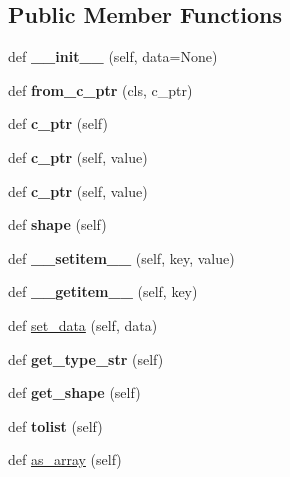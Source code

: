 \subsection*{Public Member Functions}
\begin{DoxyCompactItemize}
\item 
def {\bfseries \+\_\+\+\_\+init\+\_\+\+\_\+} (self, data=None)\hypertarget{a00002_a2cad05f1fdef0f40c5bafacfd8345404}{}\label{a00002_a2cad05f1fdef0f40c5bafacfd8345404}

\item 
def {\bfseries from\+\_\+c\+\_\+ptr} (cls, c\+\_\+ptr)\hypertarget{a00002_adac78b1be622ccda340ff3d2bada6c80}{}\label{a00002_adac78b1be622ccda340ff3d2bada6c80}

\item 
def {\bfseries c\+\_\+ptr} (self)\hypertarget{a00002_a850482baa4f0fbb70d64d00ddb106d0b}{}\label{a00002_a850482baa4f0fbb70d64d00ddb106d0b}

\item 
def {\bfseries c\+\_\+ptr} (self, value)\hypertarget{a00002_a12837a146c289d28a0e3afb831fe095a}{}\label{a00002_a12837a146c289d28a0e3afb831fe095a}

\item 
def {\bfseries c\+\_\+ptr} (self, value)\hypertarget{a00002_a12837a146c289d28a0e3afb831fe095a}{}\label{a00002_a12837a146c289d28a0e3afb831fe095a}

\item 
def {\bfseries shape} (self)\hypertarget{a00002_a57ffc01d476e783c0f3cdc6e34b2acf5}{}\label{a00002_a57ffc01d476e783c0f3cdc6e34b2acf5}

\item 
def {\bfseries \+\_\+\+\_\+setitem\+\_\+\+\_\+} (self, key, value)\hypertarget{a00002_a50c2a3bcb7e6ed02394db3bcedbb90bd}{}\label{a00002_a50c2a3bcb7e6ed02394db3bcedbb90bd}

\item 
def {\bfseries \+\_\+\+\_\+getitem\+\_\+\+\_\+} (self, key)\hypertarget{a00002_a18c755c410c192bc9f944f54d03efcad}{}\label{a00002_a18c755c410c192bc9f944f54d03efcad}

\item 
def \hyperlink{a00002_a42b5d61d63e3ff6c9a0824eeaa5af88d}{set\+\_\+data} (self, data)
\item 
def {\bfseries get\+\_\+type\+\_\+str} (self)\hypertarget{a00002_a713e9156f96be1d70589536fe8466980}{}\label{a00002_a713e9156f96be1d70589536fe8466980}

\item 
def {\bfseries get\+\_\+shape} (self)\hypertarget{a00002_a2d338e04a2dac45cc0c14238236573d2}{}\label{a00002_a2d338e04a2dac45cc0c14238236573d2}

\item 
def {\bfseries tolist} (self)\hypertarget{a00002_a75eee53f2cdacdb2e6489d807781fb45}{}\label{a00002_a75eee53f2cdacdb2e6489d807781fb45}

\item 
def \hyperlink{a00002_a25c3660aa475054863838e9af3feae4b}{as\+\_\+array} (self)
\end{DoxyCompactItemize}

